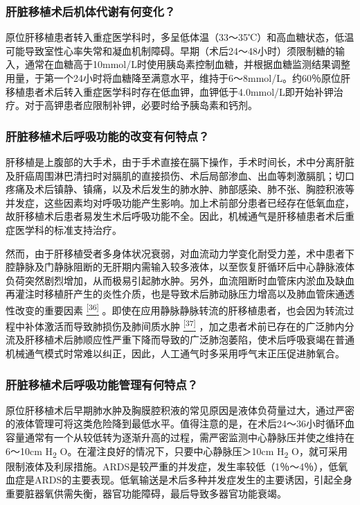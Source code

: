 \subsubsection{肝脏移植术后机体代谢有何变化？}

原位肝移植患者转入重症医学科时，多呈低体温（33～35℃）和高血糖状态，低温可能导致室性心率失常和凝血机制障碍。早期（术后24～48小时）须限制糖的输入，通常在血糖高于10mmol/L时使用胰岛素控制血糖，并根据血糖监测结果调整用量，于第一个24小时将血糖降至满意水平，维持于6～8mmol/L。约60％原位肝移植患者术后转入重症医学科时存在低血钾，血钾低于4.0mmol/L即开始补钾治疗。对于高钾患者应限制补钾，必要时给予胰岛素和钙剂。

\subsubsection{肝脏移植术后呼吸功能的改变有何特点？}

肝移植是上腹部的大手术，由于手术直接在膈下操作，手术时间长，术中分离肝脏及肝癌周围淋巴清扫时对膈肌的直接损伤、术后局部渗血、出血等刺激膈肌；切口疼痛及术后镇静、镇痛，以及术后发生的肺水肿、肺部感染、肺不张、胸腔积液等并发症，这些因素均对呼吸功能产生影响。加上术前部分患者已经存在低氧血症，故肝移植术后患者易发生术后呼吸功能不全。因此，机械通气是肝移植患者术后重症医学科的标准支持治疗。

然而，由于肝移植受者多身体状况衰弱，对血流动力学变化耐受力差，术中患者下腔静脉及门静脉阻断的无肝期内需输入较多液体，以至恢复肝循环后中心静脉液体负荷突然剧烈增加，从而极易引起肺水肿。另外，血流阻断时血管床内淤血及缺血再灌注时移植肝产生的炎性介质，也是导致术后肺动脉压力增高以及肺血管床通透性改变的重要因素
\protect\hyperlink{text00020.htmlux5cux23ch36-19}{\textsuperscript{{[}36{]}}}
。即使在应用静脉静脉转流的肝移植患者，也会因为转流过程中补体激活而导致肺损伤及肺间质水肿
\protect\hyperlink{text00020.htmlux5cux23ch37-19}{\textsuperscript{{[}37{]}}}
，加之患者术前已存在的广泛肺内分流及肝移植术后肺顺应性严重下降而导致的广泛肺泡萎陷，使术后呼吸衰竭在普通机械通气模式时常难以纠正，因此，人工通气时多采用呼气末正压促进肺氧合。

\subsubsection{肝脏移植术后呼吸功能管理有何特点？}

原位肝移植术后早期肺水肿及胸膜腔积液的常见原因是液体负荷量过大，通过严密的液体管理可将这类危险降到最低水平。值得注意的是，在术后24～36小时循环血容量通常有一个从较低转为逐渐升高的过程，需严密监测中心静脉压并使之维持在6～10cm
H\textsubscript{2} O。在灌注良好的情况下，只要中心静脉压＞10cm
H\textsubscript{2}
O，就可采用限制液体及利尿措施。ARDS是较严重的并发症，发生率较低（1％～4％），低氧血症是ARDS的主要表现。低氧输送是术后多种并发症发生的主要诱因，引起全身重要脏器氧供需失衡，器官功能障碍，最后导致多器官功能衰竭。

